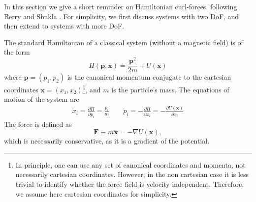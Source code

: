 In this section we give a short reminder on Hamiltonian curl-forces, following Berry and Shukla \cite{berry2015hamiltonian}. For simplicity, we first discuss systems with two DoF, and then extend to systems with more DoF.

The standard Hamiltonian of a classical system (without a magnetic field) is of the form 
\begin{equation}\label{eq:Classical_Hamiltonian}
    H(\mathbf p,\mathbf x) = \frac{\mathbf{p}^2}{2m} + U(\mathbf x)
\end{equation}
where $\mathbf p=(p_{1},p_{2})$ is the canonical momentum conjugate to the cartesian coordinates $\mathbf x = (x_1,x_2)$\footnote{In principle, one can use any set of canonical coordinates and momenta, not necessarily cartesian coordinates. However, in the non cartesian case it is less trivial to identify whether the force field is velocity independent. Therefore, we assume here cartesian coordinates for simplicity.}, and $m$ is the particle's mass. The equations of motion of the system are
\begin{eqnarray} \label{eq:EqOfMotion}
    \dot x_i = \frac{\partial H}{\partial p_i} = \frac{p_i}{m} \qquad 
    \dot p_i=-\frac{\partial H}{\partial x_i} = -\frac{\partial U(\mathbf x)}{\partial x_i} 
\end{eqnarray}
The force is defined as 
\begin{equation} \label{eq:NewtonForce}
    \mathbf F \equiv m\ddot{\mathbf x} = -\nabla U(\mathbf x),
\end{equation}
which is necessarily conservative, as it is a gradient of the potential. 

